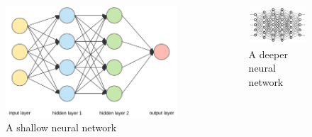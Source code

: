 \documentclass{beamer}
\begin{document}
\begin{frame}
\begin{center}
  \begin{columns}
    \begin{column}{0.5\textwidth}
      \begin{figure}
        \centering
        \includegraphics[width=\textwidth]{nn_1.png}
        \caption{A shallow neural network}
      \end{figure}
    \end{column}
    \begin{column}{0.5\textwidth}
      \begin{figure}
        \centering
        \includegraphics[width=\textwidth]{nn_2.jpeg}
        \caption{A deeper neural network}
      \end{figure}
    \end{column}
  \end{columns}
\end{center}


\end{frame}
\end{document}
